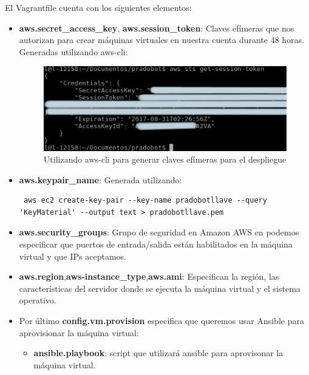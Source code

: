 El Vagrantfile cuenta con los siguientes elementos:
\begin{itemize}
\item \textbf{aws.secret\_access\_key}, \textbf{aws.session\_token}: Claves efímeras que nos autorizan para crear máquinas virtuales en nuestra cuenta durante 48 horas. Generadas utilizando aws-cli:

\begin{figure}[H] %
\centering
\includegraphics[scale=0.6]{imagenes/random/1234sts.png}  %

\caption{Utilizando aws-cli para generar claves efímeras para el despliegue}\label{figura90}

\end{figure}
\item \textbf{aws.keypair\_name}: Generada utilizando:
\begin{lstlisting}
 aws ec2 create-key-pair --key-name pradobotllave --query 'KeyMaterial' --output text > pradobotllave.pem
\end{lstlisting}
\item \textbf{aws.security\_groups}: Grupo de seguridad en Amazon AWS en  podemos especificar que puertos de entrada/salida están habilitados en la máquina virtual y que IPs aceptamos.
\item \textbf{aws.region},\textbf{aws-instance\_type},\textbf{aws.ami}: Especifican la región, las características del servidor donde se ejecuta la máquina virtual y el sistema operativo.
\item Por último \textbf{config.vm.provision} especifica que queremos usar Ansible para aprovisionar la máquina virtual:
\begin{itemize}
\item \textbf{ansible.playbook}: script que utilizará ansible para aprovisonar la máquina virtual.
\end{itemize}
\end{itemize}

